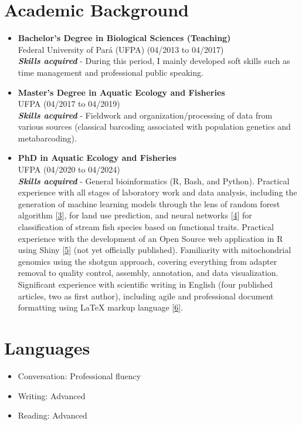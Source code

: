 \documentclass[a4paper,10pt]{article}
\begin{document}
\section*{Academic Background}
\begin{itemize}[left=0pt]
	\item \textbf{Bachelor's Degree in Biological Sciences (Teaching)}\\
	Federal University of Pará (UFPA) (04/2013 to 04/2017)\\
	\textbf{\textit{Skills acquired}} - During this period, I mainly developed soft skills such as time management and professional public speaking.
	
	\item \textbf{Master's Degree in Aquatic Ecology and Fisheries}\\
	UFPA (04/2017 to 04/2019)\\
	\textbf{\textit{Skills acquired}} - Fieldwork and organization/processing of data from various sources (classical barcoding associated with population genetics and metabarcoding).
	
	\item \textbf{PhD in Aquatic Ecology and Fisheries}\\
	UFPA (04/2020 to 04/2024)\\
	\textbf{\textit{Skills acquired}} - General bioinformatics (R, Bash, and Python). Practical experience with all stages of laboratory work and data analysis, including the generation of machine learning models through the lens of random forest algorithm [\href{https://www.linkedin.com/feed/update/urn:li:activity:7147371811264000000/}{3}], for land use prediction, and neural networks [\href{https://github.com/fabricioA14/Neural_Networks_Tensorflow}{4}] for classification of stream fish species based on functional traits. Practical experience with the development of an Open Source web application in R using Shiny [\href{https://github.com/fabricioA14/refDBdelimiter}{5}] (not yet officially published). Familiarity with mitochondrial genomics using the shotgun approach, covering everything from adapter removal to quality control, assembly, annotation, and data visualization. Significant experience with scientific writing in English (four published articles, two as first author), including agile and professional document formatting using LaTeX markup language [\href{https://github.com/fabricioA14/Curriculum_Vitae_LaTeX}{6}].
\end{itemize}

\section*{Languages}
\begin{itemize}[left=0pt]
	\item Conversation: Professional fluency
	\item Writing: Advanced
	\item Reading: Advanced
\end{itemize}
\end{document}
